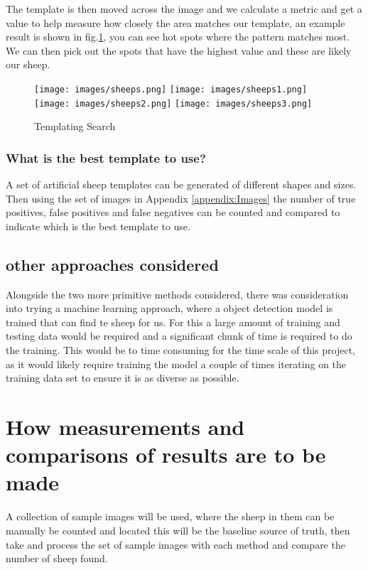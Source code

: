     The template is then moved across the image and we calculate a metric and get a value to help measure how closely the area matches our template, an example result is shown in fig.\ref{sheeps}, you can see hot spots where the pattern matches most. We can then pick out the spots that have the highest value and these are likely our sheep.
    
    \begin{figure}
    \caption{Templating Search}
        \texttt{[image: images/sheeps.png]}
        \texttt{[image: images/sheeps1.png]}
        \texttt{[image: images/sheeps2.png]}
        \texttt{[image: images/sheeps3.png]}
        \label{sheeps}
    \end{figure}
    
\subsubsection{What is the best template to use?}

A set of artificial sheep templates can be generated of different shapes and sizes. Then using the set of images in Appendix \ref{appendix:Images} the number of true positives, false positives and false negatives can be counted and compared to indicate which is the best template to use. 

\subsection{other approaches considered}

Alongside the two more primitive methods considered, there was consideration into trying a machine learning approach, where a object detection model is trained that can find te sheep for us. 
For this a large amount of training and testing data would be required and a significant chunk of time is required to do the training. 
This would be to time consuming for the time scale of this project, as it would likely require training the model a couple of times iterating on the training data set to ensure it is as diverse as possible.

\section{How measurements and comparisons of results are to be made}
A collection of sample images will be used, where the sheep in them can be manually be counted and located this will be the baseline source of truth, then take and process the set of sample images with each method and compare the number of sheep found. 

